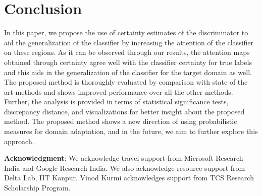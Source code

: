 \documentclass[10pt,twocolumn,letterpaper]{article}
\begin{document}
\vspace{-0.2cm}
\section{Conclusion}
In this paper, we propose the use of certainty estimates of the discriminator to aid the generalization of the classifier by increasing the attention of the classifier on these regions. As it can be observed through our results, the attention maps obtained through certainty agree well with the classifier certainty for true labels and this aids in the generalization of the classifier for the target domain as well. The proposed method is thoroughly evaluated by comparison with state of the art methods and shows improved performance over all the other methods. Further, the analysis is provided in terms of statistical significance tests, discrepancy distance, and visualizations for better insight about the proposed method. The proposed method shows a new direction of using probabilistic measures for domain adaptation, and in the future, we aim to further explore this approach.

\vspace{1em}

\textbf{Acknowledgment}: We acknowledge travel support from Microsoft Research India and Google Research India. We also acknowledge resource support from Delta Lab, IIT Kanpur. Vinod Kurmi acknowledges
support from TCS Research Scholarship Program.
\newpage
{\small


}
\end{document}
